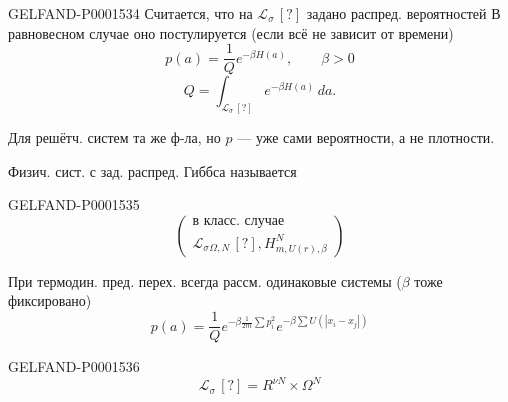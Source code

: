 \par\noindent\begin{minipage}[t]{\linewidth}

\begin{GelfandAdjacentEvidence}{GELFAND-P000153}{4}
Считается, что на $\mathcal L_\sigma\,[?]$ задано распред. вероятностей
В равновесном случае оно постулируется
(если всё не зависит от времени)
\begin{equation*}
p(a)=\frac1Qe^{-\beta H(a)},\qquad\beta>0
\end{equation*}
\begin{equation*}
Q=\int_{\mathcal L_\sigma\,[?]}e^{-\beta H(a)}\,da.
\end{equation*}
\end{GelfandAdjacentEvidence}
\end{minipage}\par



Для решётч. систем та же ф-ла, но $p$ — уже
сами вероятности, а не плотности.

Физич. сист. с зад. распред. Гиббса называется

\begin{GelfandAdjacentEvidence}{GELFAND-P000153}{5}
\begin{equation*}
\left(\begin{gathered}\text{в класс. случае}\\
\mathcal L_\sigma{}_{\Omega,N}\,[?],H^N_{m,U(r),\beta}\end{gathered}\right)
\end{equation*}
\end{GelfandAdjacentEvidence}


При термодин. пред. перех. всегда рассм. одинаковые
системы ($\beta$ тоже фиксировано)
\begin{equation*}
p(a)=\frac1Qe^{-\beta\frac1{2m}\sum p_i^2}e^{-\beta\sum U(|x_i-x_j|)}
\end{equation*}

\begin{GelfandAdjacentEvidence}{GELFAND-P000153}{6}
\begin{equation*}
\mathcal L_\sigma\,[?]=R^{\nu N}\times\Omega^N
\end{equation*}
\end{GelfandAdjacentEvidence}



